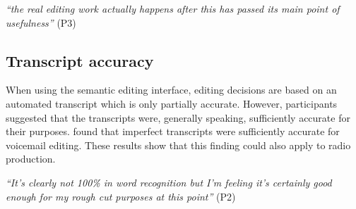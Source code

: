 \textit{``the real editing work actually happens after this has passed its main
  point of usefulness''} (P3)











\subsection{Transcript accuracy}
When using the semantic editing interface, editing decisions are based
on an automated transcript which is only partially accurate. However,
participants suggested that the transcripts were, generally speaking,
sufficiently accurate for their purposes.  \citet{Whittaker2004} found that
imperfect transcripts were sufficiently accurate for voicemail editing. These
results show that this finding could also apply to radio production.

\textit{``It's clearly not 100\% in word recognition but I'm feeling it's
  certainly good enough for my rough cut purposes at this point''} (P2)

